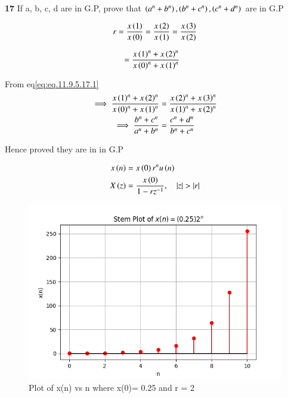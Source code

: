 \documentclass[journal,12pt,twocolumn]{IEEEtran}
\theoremstyle{remark}
\begin{document}


\vspace{3cm}

\title{}
\author{EE23BTECH11047 - Deepakreddy P
}
\maketitle
\newpage
\bigskip

\noindent \textbf{17} \quad 
If a, b, c, d are in G.P, prove that 
$ \left(a^{n} + b^{n}\right),\left(b^{n} + c^{n}\right),\left(c^{n} + d^{n}\right) $ are in G.P \\
\solution

\begin{center}
    \begin{table}[ht]
        
    \end{table}
\end{center}


\begin{align}   
r=\frac{x\left(1\right)}{x\left(0\right)} = \frac{x\left(2\right)}{x\left(1\right)}= \frac{x\left(3\right)}{x\left(2\right)} \label{eq:eq.11.9.5.17.1}
\end{align}

\begin{align} 
   &= \frac{x\left(1\right)^n + x\left(2\right)^n }{x\left(0\right)^n + x\left(1\right)^n}
\end{align}

From eq\eqref{eq:eq.11.9.5.17.1}\\

\begin{align}
\implies \frac{x\left(1\right)^n + x\left(2\right)^n }{x\left(0\right)^n + x\left(1\right)^n} &= \frac{x\left(2\right)^n + x\left(3\right)^n}{x\left(1\right)^n + x\left(2\right)^n}\\
\implies \frac{b^n + c^n}{a^n + b^n} &= \frac{c^n + d^n}{b^n + c^n}
\end{align}

Hence proved they are in in G.P

\begin{align}
    x\brak{n} &= x\brak{0}r^{n} u\brak{n}\\
    X\brak{z} &= \frac{x\brak{0}}{1-rz^{-1}}, \quad |z|>|r|
\end{align}

\begin{figure}[htbp]
   \centering
   \includegraphics[width=1\columnwidth]{figs/gp.png}
   \caption{Plot of x(n) vs n where x(0)= 0.25 and r = 2}
   \label{fig: Stem plot of x(n)}
\end{figure}
\end{document}
